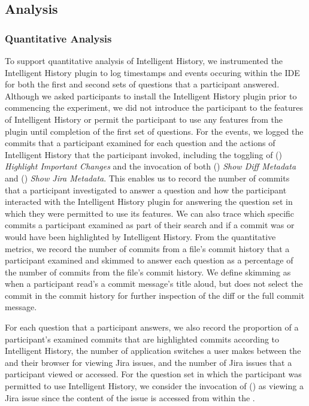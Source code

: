 \subsection{Analysis}

\subsubsection{Quantitative Analysis}

To support quantitative analysis of Intelligent History, 
we instrumented the Intelligent History plugin to log timestamps and events occuring within the IDE
for both the first and second sets of questions that a participant answered.
Although we asked participants to install the Intelligent History plugin prior to commencing the
experiment, we did not introduce the participant to the features of Intelligent History 
or permit the participant to use any features from the plugin until completion of the first set of questions.
For the events, we logged the commits that a participant examined for each question 
and the actions of Intelligent History that the participant invoked,
including the toggling of () \textit{Highlight Important Changes} 
and the invocation of both () \textit{Show Diff Metadata} and () \textit{Show Jira Metadata}.
This enables us to record the number of commits that a participant investigated to answer a question 
and how the participant interacted with the Intelligent History plugin for answering the question set in which they were permitted to use its features.
We can also trace which specific commits a participant examined as part of their search and if a commit was 
or would have been highlighted by Intelligent History.
From the quantitative metrics, we record the number of commits from a file's commit history that a participant examined 
and skimmed to answer each question as a percentage of the number of commits from the file's commit history.
We define skimming as when a participant read's a commit message's title aloud, but does not select the commit in the commit history
for further inspection of the diff or the full commit message.

For each question that a participant answers, we also record the proportion of a participant's examined commits 
that are highlighted commits according to Intelligent History,
the number of application switches a user makes between the  and their browser for viewing Jira issues,
and the number of Jira issues that a participant viewed or accessed.
For the question set in which the participant was permitted to use Intelligent History, 
we consider the invocation of () as viewing a Jira issue since the content of the issue is accessed from within the .

